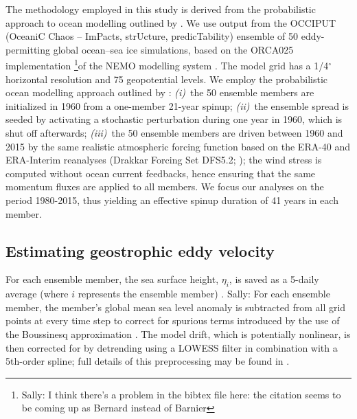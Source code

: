 \documentclass{agujournal2019}
\begin{document}
The methodology employed in this study is derived from the probabilistic approach to ocean modelling outlined by \citet{Bessieres2017}.
We use output from the OCCIPUT (OceaniC Chaos – ImPacts, strUcture, predicTability) ensemble of 50 eddy-permitting global ocean--sea ice simulations, based on the ORCA025 implementation \citep[e.g.][]{Barnier2006} \footnote{{\color{blue}Sally: I think there's a problem in the bibtex file here: the citation seems to be coming up as Bernard instead of Barnier}}of the NEMO modelling system \citep{Madec2012}. 
The model grid has a 1/4$^\circ$ horizontal resolution and 75 geopotential levels. We employ the probabilistic ocean modelling approach outlined by \citet{Bessieres2017}: \emph{(i)}~the 50 ensemble members are initialized in 1960 from a one-member 21-year spinup; \emph{(ii)}~the ensemble spread is seeded by activating a stochastic perturbation \citep{Brankart-etal-2015} during one year in 1960, which is shut off afterwards; \emph{(iii)}~the 50 ensemble members are driven between 1960 and 2015 by the same realistic atmospheric forcing function based on the ERA-40 and ERA-Interim reanalyses (Drakkar Forcing Set DFS5.2; \citet{Dussin-etal-2016}); the wind stress is computed without ocean current feedbacks, hence ensuring that the same momentum fluxes are applied to all members. 
We focus our analyses on the period 1980-2015, thus yielding an effective spinup duration of 41 years in each member. 


\subsection{Estimating geostrophic eddy velocity}
For each ensemble member, the sea surface height, $\eta_i$, is saved as a 5-daily average (where $i$ represents the ensemble member) . {\color{blue} Sally: For each ensemble member, the member's global mean sea level anomaly is subtracted from all grid points at every time step to correct for spurious terms introduced by the use of the Boussinesq approximation \citep{Greatbatch1994}. The model drift, which is potentially nonlinear, is then corrected for by detrending using a LOWESS filter \citep{Cleveland1979} in combination with a 5th-order spline; full details of this preprocessing may be found in \citep{Close2020}.}
\end{document}
